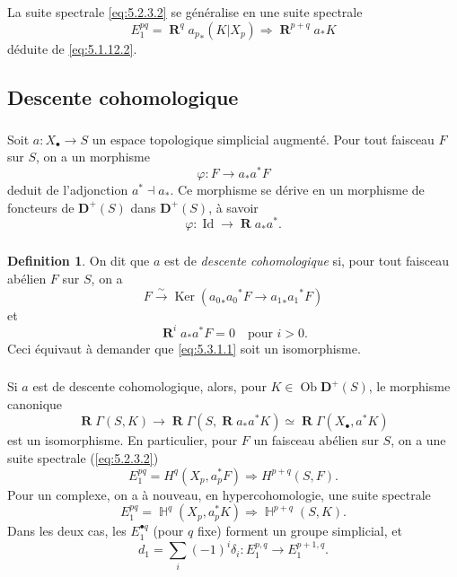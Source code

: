\documentclass[11pt]{amsart}
\theoremstyle{plain}
\theoremstyle{definition}
\newtheorem{definition}[theorem]{Definition}
\DeclareMathOperator{\Ker}{Ker}
\DeclareMathOperator{\Rd}{\mathbf{R}}
\DeclareMathOperator{\Ob}{Ob}
\DeclareMathOperator{\Id}{Id}
\DeclareMathOperator{\bH}{\mathbb{H}}
\newcommand{\DD}{\mathbf{D}}
\begin{document}
La suite spectrale \eqref{eq:5.2.3.2} se g\'en\'eralise en une suite spectrale
\begin{equation}\label{eq:5.2.7.1}
E_1^{pq} = \Rd^q {a_p}_*(K|X_p) \Rightarrow \Rd^{p+q} a_* K
\end{equation}
d\'eduite de \eqref{eq:5.1.12.2}.

\subsection{Descente cohomologique}

\subsubsection{}
Soit $a : X_\bullet \to S$ un espace topologique simplicial augment\'e. Pour tout faisceau $F$ sur $S$, on a un morphisme
\[
\varphi : F \to a_* a^* F
\]
deduit de l'adjonction $a^* \dashv a_*$. Ce morphisme se d\'erive en un morphisme de foncteurs de $\DD^+(S)$ dans $\DD^+(S)$, \`a savoir
\begin{equation}\label{eq:5.3.1.1}
\varphi : \Id \to \Rd a_* a^*.
\end{equation}

\subsubsection{}
\begin{definition}
On dit que $a$ est de \emph{descente cohomologique} si, pour tout faisceau ab\'elien $F$ sur $S$, on a
\[
F \xrightarrow{\sim} \Ker({a_0}_* {a_0}^* F \to {a_1}_* {a_1}^* F)
\]
et
\[
\Rd^i a_* a^* F = 0 \quad \text{pour } i > 0.
\]
Ceci \'equivaut \`a demander que \eqref{eq:5.3.1.1} soit un isomorphisme.
\end{definition}

\subsubsection{}
Si $a$ est de descente cohomologique, alors, pour $K \in \Ob \DD^+(S)$, le morphisme canonique
\begin{equation}\label{eq:5.3.3.1}
\Rd \Gamma(S, K) \to \Rd \Gamma(S, \Rd a_* a^* K) \simeq \Rd \Gamma(X_\bullet, a^* K)
\end{equation}
est un isomorphisme. En particulier, pour $F$ un faisceau ab\'elien sur $S$, on a une suite spectrale (\eqref{eq:5.2.3.2})
\begin{equation}\label{eq:5.3.3.2}
E_1^{pq} = H^q(X_p, a_p^* F) \Rightarrow H^{p+q}(S, F).
\end{equation}
Pour un complexe, on a \`a nouveau, en hypercohomologie, une suite spectrale
\begin{equation}\label{eq:5.3.3.3}
E_1^{pq} = \bH^q(X_p, a_p^* K) \Rightarrow \bH^{p+q}(S, K).
\end{equation}
Dans les deux cas, les $E_1^{\bullet q}$ (pour $q$ fixe) forment un groupe simplicial, et
\[
d_1 = \sum_i (-1)^i \delta_i : E_1^{p,q} \to E_1^{p+1,q}.
\]
\end{document}
